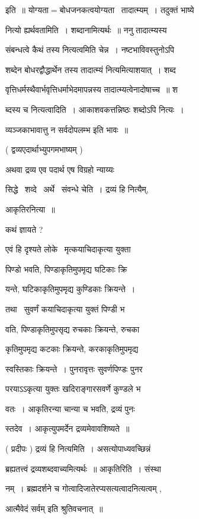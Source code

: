 \documentclass[11pt, openany]{book}
\begin{document}
इति~॥ योग्यता$=$बोधजनकत्वयोग्यता \textendash\ तादात्म्यम्~। तदुक्तं भाष्ये \textendash\ 

नित्यो ह्यर्थवतामिति~। शब्दानामित्यर्थः~॥ ननु तादात्म्यस्य 

संबन्धत्वे कैथं तस्य नित्यत्वमिति चेन्न~। नष्टभाविवस्तुनोऽपि 

शब्देन बोधरद्वौद्धार्थेन तस्य तादात्म्यं नित्यमित्याशयात्~। शब्द \textendash\ 

वृत्तिधर्मस्थैवार्भवृत्तिधर्माभेदमापन्नस्य तादात्म्यत्वेनादोषाच्च~॥ श \textendash\ 


ब्दस्य च नित्यत्वादिति~। आकाशवकत्तन्निष्ठः शब्दोऽपि नित्यः~। 

व्यञ्जकाभावात्तु न सर्वदोपलम्भ इति भावः~॥ 

( द्वव्यएदार्थाभ्युपगमभाष्यम् ) 

अथवा द्रव्य एव पदार्थ एष विग्रहो न्याय्यः \textendash\ 

सिद्धे \textendash\ शव्दे \textendash\ अर्थे \textendash\ संवन्धे चेति~। द्रव्यं हि नित्यैम्, 

आकृतिरनित्या~॥ 

कथं ज्ञायते ? 

एवं हि दृश्यते लोके \textendash\ मृत्कयाचिदाकृत्या युक्ता 

पिण्डो भवति, पिण्डाकृतिमुपमृद्य घटिकाः क्रि \textendash\ 

यन्ते, घटिकाकृतिमुपमृद्य कुण्डिकाः क्रियन्ते~। 

तथा \textendash\ सुवर्णं कयाचिदाकृत्या युक्तं पिण्डी भ \textendash\ 

वति, पिण्डाकृतिमुपसृद्य रुचकाः क्रियन्ते, रुचका \textendash\ 

कृतिमुपमृद्य कटकाः क्रियन्ते, करकाकृतिमुपमृद्य 

स्वस्तिकाः क्रियन्ते~। पुनरावृत्तः सुवर्णपिण्डः पुनर \textendash\ 

परयाऽऽकृत्या युक्तः खदिराङ्गारसवर्णे कुण्डले भ \textendash\ 

वतः~। आकृतिरन्या चान्या च भवति, द्रव्यं पुनः \textendash\ 

स्तदेव~। आकृत्युपमर्देन द्रव्यमेवावशिष्यते~॥ 

( प्रदीपः ) द्रव्यं हि नित्यमिति~। असत्योपाध्यवच्छिन्नं 

ब्रह्यतत्त्वं द्रव्यशब्दवाच्यमित्यर्थः~॥ आकृतिरिति~। संस्था \textendash\ 

नम्~। ब्रह्मदर्शने च गोत्वादिजातेरप्यसत्यत्वादनित्यत्वम् , 

{\qt आत्मैवेदं सर्वम्} इति श्रुतिवचनात्~॥
\end{document}
